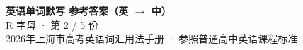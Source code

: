 \documentclass[10pt,a4paper]{article}
\begin{document}
\pagestyle{plain}

\begin{center}
{\LARGE\bfseries 英语单词默写 \quad 参考答案（英 $\to$ 中）}\\[0.22em]
{\large R 字母 · 第 2 / 5 份}\\[0.18em]
{\small 2026年上海市高考英语词汇用法手册 · 参照普通高中英语课程标准}
\end{center}

\vspace{0.2em}
\noindent{\color{rulegray}\rule{\textwidth}{0.8pt}}

\vspace{0.35em}

\vspace{0.25em}
\renewcommand{\arraystretch}{1.32}
\end{document}
